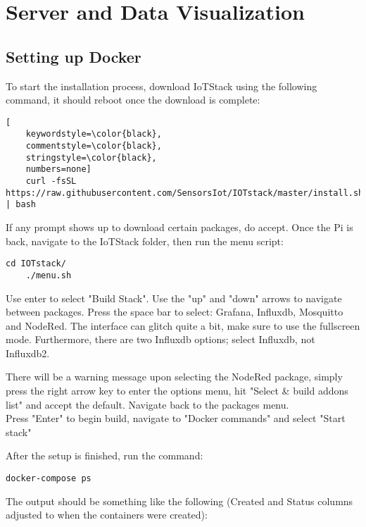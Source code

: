 \documentclass[onecolumn]{article}
\begin{document}
\section{Server and Data Visualization}

\subsection{Setting up Docker}
To start the installation process, download IoTStack using the following command, it should reboot once the download is complete:

\begin{lstlisting}[
    keywordstyle=\color{black},
    commentstyle=\color{black},
    stringstyle=\color{black},
    numbers=none]
    curl -fsSL https://raw.githubusercontent.com/SensorsIot/IOTstack/master/install.sh | bash
\end{lstlisting}

If any prompt shows up to download certain packages, do accept. Once the Pi is back, navigate to the IoTStack folder, then run the menu script:

\begin{lstlisting}[numbers=none]
    cd IOTstack/
    ./menu.sh
\end{lstlisting}

Use enter to select "Build Stack". Use the "up" and "down" arrows to navigate between packages. Press the space bar to select: Grafana, Influxdb, Mosquitto and NodeRed. The interface can glitch quite a bit, make sure to use the fullscreen mode. Furthermore, there are two Influxdb options; select Influxdb, not Influxdb2.

There will be a warning message upon selecting the NodeRed package, simply press the right arrow key to enter the options menu, hit "Select \& build addons list" and accept the default. Navigate back to the packages menu.\\

Press "Enter" to begin build, navigate to "Docker commands" and select "Start stack"

After the setup is finished, run the command:

\begin{lstlisting}[numbers=none]
    docker-compose ps
\end{lstlisting}

The output should be something like the following (Created and Status columns adjusted to when the containers were created):
\end{document}

